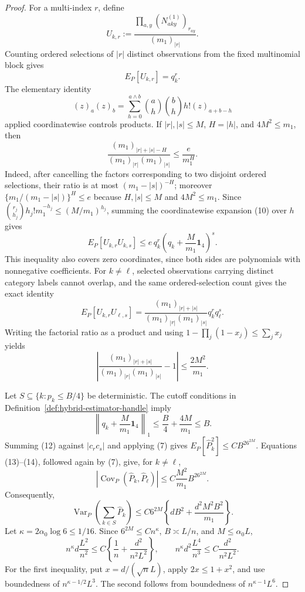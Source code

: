 \documentclass{article}
\begin{document}
\begin{proof}
For a multi-index \(r\), define
\[
U_{k,r}:=\frac{\prod_{a,y}(N^{(1)}_{aky})_{r_{ay}}}{(m_1)_{|r|}}.
\tag{8}
\]
Counting ordered selections of \(|r|\) distinct observations from the fixed multinomial block gives
\[
E_P[U_{k,r}]=q_k^r.
\tag{9}
\]
The elementary identity
\[
(z)_a(z)_b=\sum_{h=0}^{a\wedge b}\binom ah\binom bhh!(z)_{a+b-h}
\tag{10}
\]
applied coordinatewise controls products. If \(|r|,|s|\le M\), \(H=|h|\), and \(4M^2\le m_1\), then
\[
\frac{(m_1)_{|r|+|s|-H}}{(m_1)_{|r|}(m_1)_{|s|}}\le\frac{e}{m_1^H}.
\tag{11}
\]
Indeed, after cancelling the factors corresponding to two disjoint ordered selections, their ratio is at most \((m_1-|s|)^{-H}\); moreover \(\{m_1/(m_1-|s|)\}^H\le e\) because \(H,|s|\le M\) and \(4M^2\le m_1\). Since \(\binom{r_j}{h_j}h_j!m_1^{-h_j}\le(M/m_1)^{h_j}\), summing the coordinatewise expansion (10) over \(h\) gives
\[
E_P[U_{k,r}U_{k,s}]\le e\,q_k^r\left(q_k+\frac{M}{m_1}\mathbf1_4\right)^s.
\tag{12}
\]
This inequality also covers zero coordinates, since both sides are polynomials with nonnegative coefficients. For \(k\ne\ell\), selected observations carrying distinct category labels cannot overlap, and the same ordered-selection count gives the exact identity
\[
E_P[U_{k,r}U_{\ell,s}]=\frac{(m_1)_{|r|+|s|}}{(m_1)_{|r|}(m_1)_{|s|}}q_k^rq_\ell^s.
\tag{13}
\]
Writing the factorial ratio as a product and using \(1-\prod_j(1-x_j)\le\sum_jx_j\) yields
\[
\left|\frac{(m_1)_{|r|+|s|}}{(m_1)_{|r|}(m_1)_{|s|}}-1\right|\le\frac{2M^2}{m_1}.
\tag{14}
\]

Let \(S\subseteq\{k:p_k\le B/4\}\) be deterministic. The cutoff conditions in Definition~\ref{def:hybrid-estimator-handle} imply
\[
\left\|q_k+\frac{M}{m_1}\mathbf1_4\right\|_1\le\frac B4+\frac{4M}{m_1}\le B.
\tag{15}
\]
Summing (12) against \(|c_rc_s|\) and applying (7) gives \(E_P[\widehat P_k^2]\le CB^26^{2M}\). Equations (13)--(14), followed again by (7), give, for \(k\ne\ell\),
\[
|\operatorname{Cov}_P(\widehat P_k,\widehat P_\ell)|\le C\frac{M^2}{m_1}B^26^{2M}.
\tag{16}
\]
Consequently,
\[
\operatorname{Var}_P\left(\sum_{k\in S}\widehat P_k\right)\le C6^{2M}\left\{dB^2+\frac{d^2M^2B^2}{m_1}\right\}.
\tag{17}
\]
Let \(\kappa=2\alpha_0\log6\le1/16\). Since \(6^{2M}\le Cn^\kappa\), \(B\asymp L/n\), and \(M\le\alpha_0L\),
\[
n^\kappa d\frac{L^2}{n^2}\le C\left\{\frac1n+\frac{d^2}{n^2L^2}\right\},\qquad n^\kappa d^2\frac{L^4}{n^3}\le C\frac{d^2}{n^2L^2}.
\tag{18}
\]
For the first inequality, put \(x=d/(\sqrt nL)\), apply \(2x\le1+x^2\), and use boundedness of \(n^{\kappa-1/2}L^3\). The second follows from boundedness of \(n^{\kappa-1}L^6\).


\end{proof}
\end{document}
